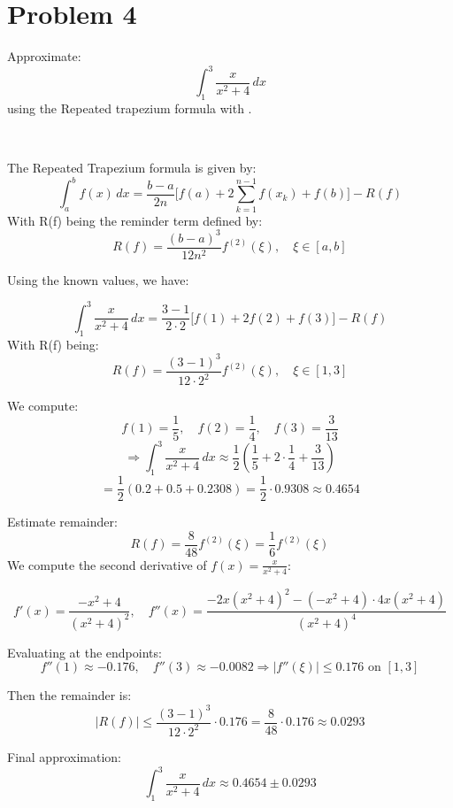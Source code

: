 \documentclass{article}
\begin{document}
\section*{Problem 4}
Approximate:
\[
    \int_{1}^{3} \frac{x}{x^2 + 4}  \, dx
\]
using the Repeated trapezium formula with .

\
\

The Repeated Trapezium formula is given by:
\[
    \int_{a}^{b} f(x) \, dx = \frac{b-a}{2n} \bigg[f(a) + 2\sum_{k=1}^{n-1}f(x_k) + f(b)\bigg] - R(f)
\]
With R(f) being the reminder term defined by:
\[
    R(f) = \frac{(b-a)^3}{12n^2}f^{(2)}(\xi), \quad \xi \in [a,b]
\]

Using the known values, we have:

\[
    \int_{1}^{3} \frac{x}{x^2 + 4}  \, dx = \frac{3-1}{2\cdot 2} \bigg[f(1) + 2f(2) + f(3)\bigg] - R(f)
\]
With R(f) being:
\[
    R(f) = \frac{(3-1)^3}{12\cdot 2^2}f^{(2)}(\xi), \quad \xi \in [1,3]
\]

We compute:
\[
f(1) = \frac{1}{5}, \quad f(2) = \frac{1}{4}, \quad f(3) = \frac{3}{13}
\]
\[
\Rightarrow \int_{1}^{3} \frac{x}{x^2 + 4}  \, dx \approx \frac{1}{2} \left( \frac{1}{5} + 2 \cdot \frac{1}{4} + \frac{3}{13} \right)
\]
\[
= \frac{1}{2} \left(0.2 + 0.5 + 0.2308\right) = \frac{1}{2} \cdot 0.9308 \approx 0.4654
\]

Estimate remainder:
\[
R(f) = \frac{8}{48} f^{(2)}(\xi) = \frac{1}{6} f^{(2)}(\xi)
\]
We compute the second derivative of \( f(x) = \frac{x}{x^2 + 4} \):

\[
f'(x) = \frac{-x^2 + 4}{(x^2 + 4)^2}, \quad
f''(x) = \frac{-2x(x^2 + 4)^2 - (-x^2 + 4)\cdot 4x(x^2 + 4)}{(x^2 + 4)^4}
\]

Evaluating at the endpoints:
\[
f''(1) \approx -0.176, \quad f''(3) \approx -0.0082
\Rightarrow |f''(\xi)| \leq 0.176 \text{ on } [1, 3]
\]

Then the remainder is:
\[
|R(f)| \leq \frac{(3 - 1)^3}{12 \cdot 2^2} \cdot 0.176 = \frac{8}{48} \cdot 0.176 \approx 0.0293
\]

Final approximation:
\[
\int_{1}^{3} \frac{x}{x^2 + 4} \, dx \approx 0.4654 \pm 0.0293
\]
\end{document}
